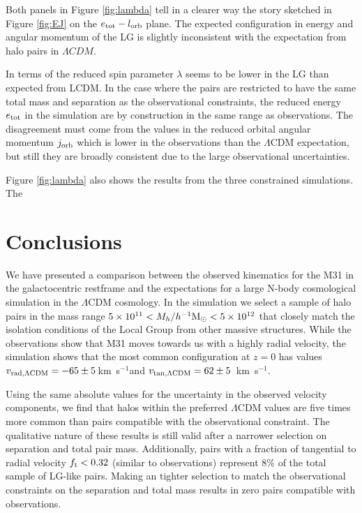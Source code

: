 \documentclass{emulateapj}
\newcommand{\kms}{\,km~s$^{-1}$}
\newcommand{\hMsun}{{\ifmmode{h^{-1}{\rm {M_{\odot}}}}\else{$h^{-1}{\rm{M_{\odot}}}$}\fi}}
\begin{document}
Both panels in Figure \ref{fig:lambda} tell in a clearer way the story sketched in Figure \ref{fig:EJ} on the $e_{\rm tot}-l_{\rm orb}$ plane. The expected configuration in energy and angular momentum of the LG is slightly inconsistent with the expectation from halo pairs in $\Lambda CDM$. 

In terms of the reduced spin parameter $\lambda$ seems to be lower in the LG than expected from LCDM. In the case where the pairs are restricted to have the same total mass and separation as the observational constraints, the reduced energy $e_{\rm tot }$ in the simulation are by construction in the same range as observations. The disagreement must come from the values in the reduced orbital angular momentum $j_{\rm orb}$ which is lower in the observations than the $\Lambda$CDM expectation, but still they are broadly consistent due to the large observational uncertainties.

Figure \ref{fig:lambda} also shows the results from the three constrained simulations. The 


\section{Conclusions}
We have presented a comparison between the observed kinematics for the M31 in the galactocentric restframe and the expectations for a large N-body cosmological simulation in the $\Lambda$CDM cosmology. In the simulation we select a sample of halo pairs in the mass range $5\times 10^{11}<M_{h}/\hMsun<5\times 10^{12}$ that closely match the isolation conditions of the Local Group from other massive structures. While the observations show that M31 moves towards us with a highly radial velocity, the simulation shows that the most common configuration at $z=0$ has values $v_{\rm rad, \Lambda CDM}=-65\pm5$\kms and $v_{\rm tan, \Lambda CDM}=62\pm5$ \kms. 


Using the same absolute values for the uncertainty in the observed velocity components, we find that halos within the preferred $\Lambda$CDM values are five times more common than pairs compatible with the observational constraint.  The qualitative nature of these results is still valid after a narrower selection on separation and total pair mass. Additionally, pairs with a fraction of tangential to radial velocity $f_{\rm t}<0.32$ (similar to observations) represent $8\%$ of the total sample of LG-like pairs. Making an tighter selection to match the observational constraints on the separation and total mass results in zero pairs compatible with observations.
\end{document}
